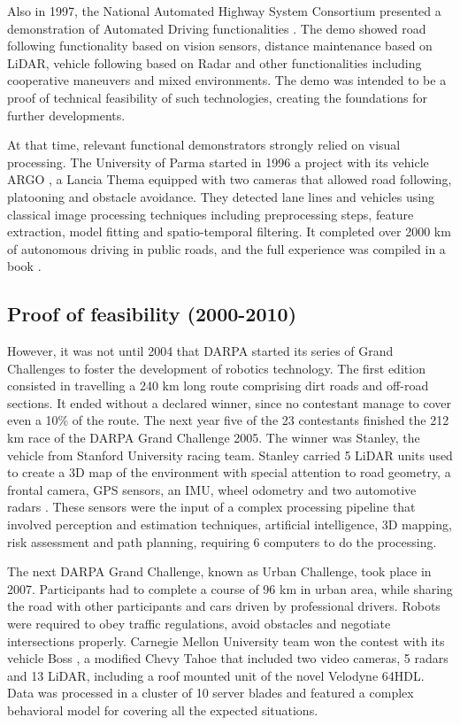 Also in 1997, the National Automated Highway System Consortium presented a 
demonstration of Automated Driving functionalities \cite{Thorpe1997}. The demo 
showed road following functionality based on vision sensors, distance 
maintenance based on LiDAR, vehicle following based on Radar and other 
functionalities including cooperative maneuvers and mixed environments. The 
demo was intended to be a proof of technical feasibility of such technologies, 
creating the foundations for further developments. 

At that time, relevant functional demonstrators strongly relied on visual 
processing. The University of Parma started in 1996 a project with its vehicle 
ARGO \cite{Broggi1998}, a Lancia Thema equipped with two cameras that allowed 
road following, platooning and obstacle avoidance. They detected lane lines and 
vehicles using classical image processing techniques including preprocessing 
steps, feature extraction, model fitting and spatio-temporal filtering.
It completed over 2000 km of autonomous driving in public roads, and the full 
experience was compiled in a book \cite{Broggi1999}.

\subsection{Proof of feasibility (2000-2010)}

However, it was not until 2004 that DARPA started its series of Grand 
Challenges to foster the development of robotics technology. The first edition 
consisted in travelling a 240 km long route comprising dirt roads and off-road 
sections. It ended without a declared winner, since no contestant manage to 
cover even a 10\% of the route. The next year five of the 23 contestants 
finished the 212 km race of the DARPA Grand Challenge 2005. The winner was 
Stanley, the vehicle from Stanford University racing team. Stanley carried 5 
LiDAR units used to create a 3D map of the environment with special attention 
to road geometry, a frontal camera, GPS sensors, an IMU, wheel odometry and two 
automotive radars \cite{Thrun2006}. These sensors were the input of a 
complex processing pipeline that involved perception and estimation techniques, 
artificial intelligence, 3D mapping, risk assessment and path planning, 
requiring 6 computers to do the processing. 

The next DARPA Grand Challenge, known as Urban Challenge, took place in 2007. Participants had to complete a course of 96 km in urban area, while sharing the road with other participants and cars driven by professional drivers. Robots were required to obey traffic regulations, avoid obstacles and negotiate intersections properly. Carnegie Mellon University team won the contest with its vehicle Boss \cite{TartanRacing2005}, a modified Chevy Tahoe that included two video cameras, 5 radars and 13 LiDAR, including a roof mounted unit of the novel Velodyne 64HDL. Data was processed in a cluster of 10 server blades and featured a complex behavioral model \cite{Urmson2007} for covering all the expected situations.

